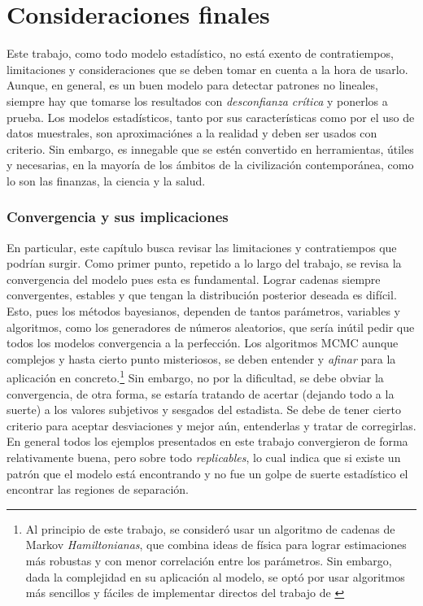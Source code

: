 \documentclass[../Main/Main.tex]{subfiles}
\begin{document}
\section{Consideraciones finales}

Este trabajo, como todo modelo estadístico, no está exento de contratiempos, limitaciones y consideraciones que se deben tomar en cuenta a la hora de usarlo. Aunque, en general, es un buen modelo para detectar patrones no lineales, siempre hay que tomarse los resultados con \textit{desconfianza crítica} y ponerlos a prueba. Los modelos estadísticos, tanto por sus características como por el uso de datos muestrales, son aproximaciónes a la realidad y deben ser usados con criterio. Sin embargo, es innegable que se estén convertido en herramientas, útiles y necesarias, en la mayoría de los ámbitos de la civilización contemporánea, como lo son las finanzas, la ciencia y la salud.

\subsubsection*{Convergencia y sus implicaciones}
En particular, este capítulo busca revisar las limitaciones y contratiempos que podrían surgir. Como primer punto, repetido a lo largo del trabajo, se revisa la convergencia del modelo pues esta es fundamental. Lograr cadenas siempre convergentes, estables y que tengan la distribución posterior deseada es  difícil. Esto, pues los métodos bayesianos, dependen de tantos  parámetros, variables y algoritmos, como los generadores de números aleatorios, que sería inútil pedir que todos los modelos convergencia a la perfección. Los algoritmos MCMC aunque complejos y hasta cierto punto misteriosos, se deben entender y \textit{afinar} para la aplicación en concreto.\footnote{Al principio de este trabajo, se consideró usar un algoritmo de cadenas de Markov \textit{Hamiltonianas}, que combina ideas de física para lograr estimaciones más robustas y con menor correlación entre los parámetros. Sin embargo, dada la complejidad en su aplicación al modelo, se optó por usar algoritmos más sencillos y fáciles de implementar directos del trabajo de \autocite{albert1993bayesian}} Sin embargo, no por la dificultad, se debe obviar la convergencia, de otra forma, se estaría tratando de acertar (dejando todo a la suerte) a los valores subjetivos y sesgados del estadista. Se debe de tener cierto criterio para aceptar desviaciones y mejor aún, entenderlas y tratar de corregirlas. En general todos los ejemplos presentados en este trabajo convergieron de forma relativamente buena, pero sobre todo \textit{replicables}, lo cual indica que si existe un patrón que el modelo está encontrando y no fue un golpe de suerte estadístico el encontrar las regiones de separación. %
\end{document}
